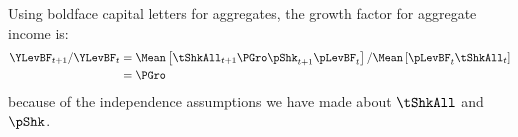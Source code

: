 \documentclass[BufferStockTheory]{subfiles}
\begin{document}
Using boldface capital letters for aggregates, the growth factor for aggregate income is:
\begin{align*}
  \YLevBF_{t+1}/\YLevBF_{t}  & = \Mean\left[\tShkAll_{t+1}\PGro \pShk_{t+1}\pLevBF_{t}\right]/\Mean\left[\pLevBF_{t}\tShkAll_{t}\right]  \\
                             & = \PGro
\end{align*}
because of the independence assumptions we have made about $\tShkAll$ and $\pShk$.

\begin{comment}
From the perspective of period $t$, %
\begin{align*}
  \BLevBF_{t+1} & = \Mean[b_{t+1} \pLevBF_{t+1}]
  \\              & = \PGro \Mean[a_{t}(\Rfree/(\PGro\pShk_{t+1}))\pShk_{t+1}\pLevBF_{t}]
  \\              & = \PGro \Mean[a_{t}\Rnorm\pLevBF_{t}]
  \\              & = \PGro \Mean[(\mRat_{t}-\cFunc(\mRat_{t}))\Rnorm\pLevBF_{t}]
  \\              & = \PGro \Mean[(\bRat_{t}+\tShk_{t}-\cFunc(\bRat_{t}+\tShk_{t}))\Rnorm\pLevBF_{t}]
\end{align*}
\end{comment}
\end{document}
